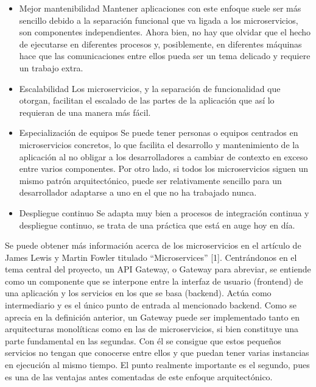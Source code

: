 \documentclass[11pt,spanish,listoffigures]{tfgetsinf}
\begin{document}
\begin{itemize}
	\item Mejor mantenibilidad
Mantener aplicaciones con este enfoque suele ser más sencillo debido a la separación funcional que va ligada a los microservicios, son componentes independientes. Ahora bien, no hay que olvidar que el hecho de ejecutarse en diferentes procesos y, posiblemente, en diferentes máquinas hace que las comunicaciones entre ellos pueda ser un tema delicado y requiere un trabajo extra.

	\item Escalabilidad
Los microservicios, y la separación de funcionalidad que otorgan, facilitan el escalado de las partes de la aplicación que así lo requieran de una manera más fácil.

	\item Especialización de equipos
Se puede tener personas o equipos centrados en microservicios concretos, lo que facilita el desarrollo y mantenimiento de la aplicación al no obligar a los desarrolladores a cambiar de contexto en exceso entre varios componentes. Por otro lado, si todos los microservicios siguen un mismo patrón arquitectónico, puede ser relativamente sencillo para un desarrollador adaptarse a uno en el que no ha trabajado nunca.

	\item Despliegue continuo
Se adapta muy bien a procesos de integración continua y despliegue continuo, se trata de una práctica que está en auge hoy en día.

\end{itemize}

Se puede obtener más información acerca de los microservicios en el artículo de James Lewis y Martin Fowler titulado “Microservices” [1].
Centrándonos en el tema central del proyecto, un API Gateway, o Gateway para abreviar, se entiende como un componente que se interpone entre la interfaz de usuario (frontend) de una aplicación y los servicios en los que se basa (backend). Actúa como intermediario y es el único punto de entrada al mencionado backend.
Como se aprecia en la definición anterior, un Gateway puede ser implementado tanto en arquitecturas monolíticas como en las de microservicios, si bien constituye una parte fundamental en las segundas. Con él se consigue que estos pequeños servicios no tengan que conocerse entre ellos y que puedan tener varias instancias en ejecución al mismo tiempo. El punto realmente importante es el segundo, pues es una de las ventajas antes comentadas de este enfoque arquitectónico.
\end{document}
